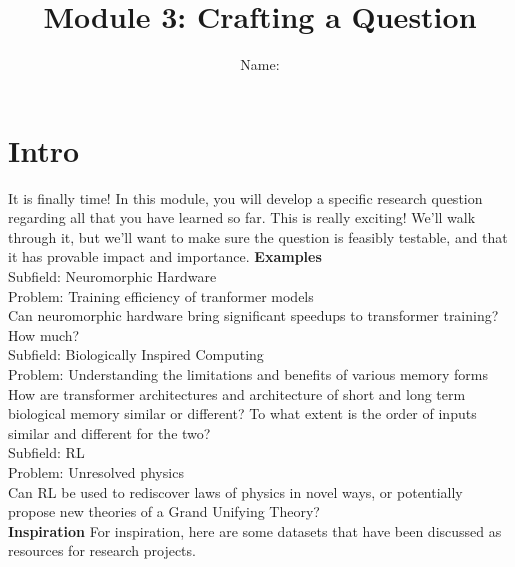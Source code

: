 \documentclass[letterpaper,11pt]{article}
\begin{document}
\title{{\bf Module 3: Crafting a Question} }
\author{Name: }

\date{}
\maketitle

\section{Intro}
It is finally time! In this module, you will develop a specific research question regarding all that you have learned so far.
This is really exciting! We'll walk through it, but we'll want to make sure the question is feasibly testable, and that it has provable impact and importance.
\newline
\newline
\textbf{Examples}\\
Subfield: Neuromorphic Hardware \\
Problem: Training efficiency of tranformer models \\
Can neuromorphic hardware bring significant speedups to transformer training? How much? \\
\newline
Subfield: Biologically Inspired Computing\\
Problem: Understanding the limitations and benefits of various memory forms\\
How are transformer architectures and architecture of short and long term biological memory similar or different? To what extent is the order of inputs similar and different for the two?\\
\newline
Subfield: RL\\
Problem: Unresolved physics\\
Can RL be used to rediscover laws of physics in novel ways, or potentially propose new theories of a Grand Unifying Theory?\\
\newline
\textbf{Inspiration}
For inspiration, here are some datasets that have been discussed as resources for research projects. \\
\end{document}

